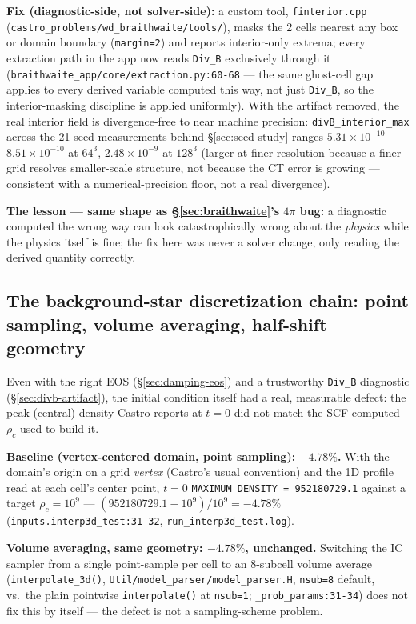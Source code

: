 \documentclass[11pt,a4paper]{scrartcl}
\newcommand{\code}[1]{\texttt{\small #1}}
\begin{document}
\textbf{Fix (diagnostic-side, not solver-side):} a custom tool,
\code{finterior.cpp} (\code{castro\_problems/wd\_braithwaite/tools/}),
masks the 2 cells nearest any box or domain boundary (\code{margin=2})
and reports interior-only extrema; every extraction path in the app now
reads \code{Div\_B} exclusively through it
(\code{braithwaite\_app/core/extraction.py:60-68} --- the same
ghost-cell gap applies to every derived variable computed this way, not
just \code{Div\_B}, so the interior-masking discipline is applied
uniformly). With the artifact removed, the real interior field is
divergence-free to near machine precision: \code{divB\_interior\_max}
across the 21 seed measurements behind \S\ref{sec:seed-study} ranges
$5.31\times10^{-10}$--$8.51\times10^{-10}$ at $64^3$,
$2.48\times10^{-9}$ at $128^3$ (larger at finer resolution because a
finer grid resolves smaller-scale structure, not because the CT error
is growing --- consistent with a numerical-precision floor, not a real
divergence).

\textbf{The lesson --- same shape as \S\ref{sec:braithwaite}'s $4\pi$
bug:} a diagnostic computed the wrong way can look catastrophically
wrong about the \emph{physics} while the physics itself is fine; the
fix here was never a solver change, only reading the derived quantity
correctly.

\subsection{The background-star discretization chain: point sampling, volume averaging, half-shift geometry}
\label{sec:discretization-chain}

Even with the right EOS (\S\ref{sec:damping-eos}) and a trustworthy
\code{Div\_B} diagnostic (\S\ref{sec:divb-artifact}), the initial
condition itself had a real, measurable defect: the peak (central)
density Castro reports at $t=0$ did not match the SCF-computed $\rho_c$
used to build it.

\textbf{Baseline (vertex-centered domain, point sampling): $-4.78\%$.}
With the domain's origin on a grid \emph{vertex} (Castro's usual
convention) and the 1D profile read at each cell's center point, $t=0$
\code{MAXIMUM DENSITY = 952180729.1} against a target $\rho_c=10^9$ ---
$(952180729.1-10^9)/10^9=-4.78\%$ (\code{inputs.interp3d\_test:31-32},
\code{run\_interp3d\_test.log}).

\textbf{Volume averaging, same geometry: $-4.78\%$, unchanged.}
Switching the IC sampler from a single point-sample per cell to an
8-subcell volume average (\code{interpolate\_3d()},
\code{Util/model\_parser/model\_parser.H}, \code{nsub=8} default, vs.\
the plain pointwise \code{interpolate()} at \code{nsub=1};
\code{\_prob\_params:31-34}) does not fix this by itself --- the defect
is not a sampling-scheme problem.
\end{document}
